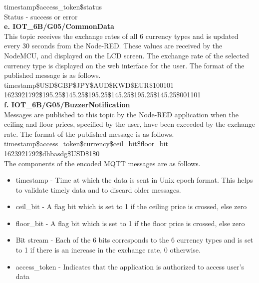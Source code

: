 timestamp\$access\_token\$status\\
Status - success or error\\

\textbf{e. IOT\_6B/G05/CommonData} \\

This topic  receives the exchange rates of all 6 currency types and is updated every 30 seconds from the Node-RED. These values are received by the NodeMCU, and displayed on the LCD screen. The exchange rate of the selected currency type is displayed on the web interface for the user. The format of the published message is as follows.\\

timestamp\$USD\$GBP\$JPY\$AUD\$KWD\$EUR\$100101 \\
1623921792\$195.25\$145.25\$195.25\$145.25\$195.25\$145.25\$001101\\

\textbf{f. IOT\_6B/G05/BuzzerNotification} \\

Messages are published to this topic by the Node-RED application when the ceiling and floor prices, specified by the user, have been exceeded by the exchange rate. The format of the published message is as follows.\\

timestamp\$access\_token\$currency\$ceil\_bit\$floor\_bit\\
1623921792\$dhbasdg\$USD\$1\$0\\


The components of the encoded MQTT messages are as follows.

\begin{itemize}[itemsep=-1.7mm]

\item timestamp - Time at which the data is sent in Unix epoch format. This helps to validate timely data and to discard older messages.
\item ceil\_bit - A flag bit which is set to 1 if the ceiling price is crossed, else zero
\item floor\_bit - A flag bit which is set to 1 if the floor price is crossed, else zero
\item Bit stream - Each of the 6 bits corresponds to the 6 currency types and is set to 1 if there is an increase in the exchange rate, 0 otherwise.
\item access\_token - Indicates that the application is authorized to access user’s data \cite{token}

\end{itemize}


